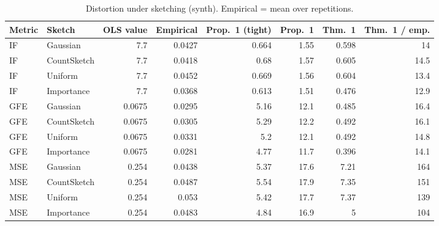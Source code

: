 \begin{table}[t]
\centering
\small
\begin{tabular}{llrrrrrr}
\toprule
Metric & Sketch & OLS value & Empirical & Prop.~1 (tight) & Prop.~1 & Thm.~1 & Thm.~1 / emp. \\
\midrule
IF & Gaussian & 7.7 & 0.0427 & 0.664 & 1.55 & 0.598 & 14 \\
IF & CountSketch & 7.7 & 0.0418 & 0.68 & 1.57 & 0.605 & 14.5 \\
IF & Uniform & 7.7 & 0.0452 & 0.669 & 1.56 & 0.604 & 13.4 \\
IF & Importance & 7.7 & 0.0368 & 0.613 & 1.51 & 0.476 & 12.9 \\
\midrule
GFE & Gaussian & 0.0675 & 0.0295 & 5.16 & 12.1 & 0.485 & 16.4 \\
GFE & CountSketch & 0.0675 & 0.0305 & 5.29 & 12.2 & 0.492 & 16.1 \\
GFE & Uniform & 0.0675 & 0.0331 & 5.2 & 12.1 & 0.492 & 14.8 \\
GFE & Importance & 0.0675 & 0.0281 & 4.77 & 11.7 & 0.396 & 14.1 \\
\midrule
MSE & Gaussian & 0.254 & 0.0438 & 5.37 & 17.6 & 7.21 & 164 \\
MSE & CountSketch & 0.254 & 0.0487 & 5.54 & 17.9 & 7.35 & 151 \\
MSE & Uniform & 0.254 & 0.053 & 5.42 & 17.7 & 7.37 & 139 \\
MSE & Importance & 0.254 & 0.0483 & 4.84 & 16.9 & 5 & 104 \\
\bottomrule
\end{tabular}
\caption{Distortion under sketching (synth). Empirical = mean over repetitions.}
\label{tab:synth}
\end{table}